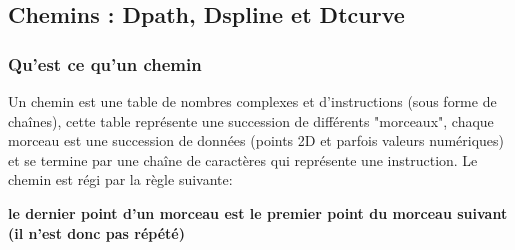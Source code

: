\subsection{Chemins : Dpath, Dspline et Dtcurve}\label{Dpath}

\subsubsection{Qu'est ce qu'un chemin}

Un chemin est une table de nombres complexes et d'instructions (sous forme de chaînes), cette table représente une succession de différents "morceaux", chaque morceau est une succession de données (points 2D et parfois valeurs numériques) et se termine par une chaîne de caractères qui représente une instruction. Le chemin est régi par la règle suivante: \par
\hfil\textbf{le dernier point d'un morceau est le premier point du morceau suivant (il n'est donc pas répété) }\hfil\par

